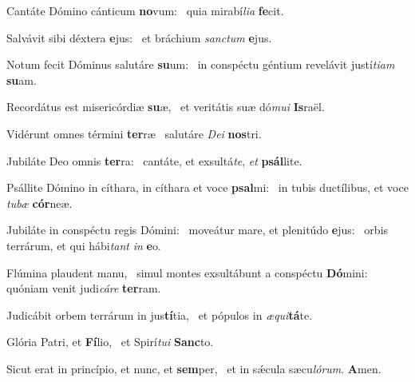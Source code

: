 \item Cantáte Dómino cánticum \textbf{no}vum:~\psstar{} quia mirabí\textit{lia} \textbf{fe}cit.
\item Salvávit sibi déxtera \textbf{e}jus:~\psstar{} et bráchium \textit{sanctum} \textbf{e}jus.
\item Notum fecit Dóminus salutáre \textbf{su}um:~\psstar{} in conspéctu géntium revelávit justí\textit{tiam} \textbf{su}am.
\item Recordátus est misericórdiæ \textbf{su}æ,~\psstar{} et veritátis suæ dó\textit{mui} \textbf{Is}raël.
\item Vidérunt omnes términi \textbf{ter}ræ~\psstar{} salutáre \textit{Dei} \textbf{nos}tri.
\item Jubiláte Deo omnis \textbf{ter}ra:~\psstar{} cantáte, et exsultá\textit{te}, \textit{et} \textbf{psál}lite.
\item Psállite Dómino in cíthara, in cíthara et voce \textbf{psal}mi:~\psstar{} in tubis ductílibus, et voce \textit{tubæ} \textbf{cór}neæ.
\item Jubiláte in conspéctu regis Dómini:~\pscross{} moveátur mare, et plenitúdo \textbf{e}jus:~\psstar{} orbis terrárum, et qui hábi\textit{tant} \textit{in} \textbf{e}o.
\item Flúmina plaudent manu,~\pscross{} simul montes exsultábunt a conspéctu \textbf{Dó}mini:~\psstar{} quóniam venit judi\textit{cáre} \textbf{ter}ram.
\item Judicábit orbem terrárum in jus\textbf{tí}tia,~\psstar{} et pópulos in \textit{æqui}\textbf{tá}te.
\item Glória Patri, et \textbf{Fí}lio,~\psstar{} et Spirí\textit{tui} \textbf{Sanc}to.
\item Sicut erat in princípio, et nunc, et \textbf{sem}per,~\psstar{} et in sǽcula sæcu\textit{lórum}. \textbf{A}men.

